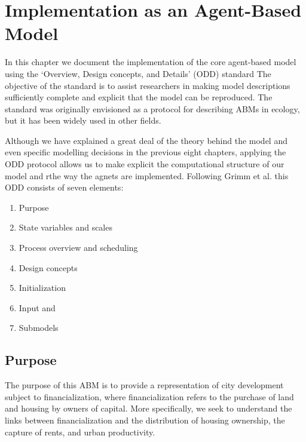 \chapter{Implementation as an Agent-Based Model} \label{chapter-agent-implementation}

In this chapter we document the implementation of the core agent-based model using the `Overview, Design concepts, and Details' (ODD) standard \cite{grimmODDProtocolReview2010a} The objective of the standard is to assist researchers in making model descriptions sufficiently complete and explicit that the model can be reproduced. The standard was originally envisioned as a protocol for describing ABMs in ecology, but it has been widely used in other fields.

Although we have explained a great deal of the theory behind the model and even specific modelling decisions in the previous eight chapters, applying the ODD protocol allows us to make explicit the computational structure of our model and rthe way the agnets are implemented. Following Grimm et al. \cite{grimmODDProtocolDescribing2020} this ODD consists of seven elements: %

\begin{enumerate}
    \item Purpose
    \item State variables and scales
    \item Process overview and scheduling 
    \item Design concepts
    \item Initialization
    \item Input and 
    \item Submodels 
\end{enumerate}




\section{Purpose}
The purpose of this ABM is to provide a representation of city development subject to financialization, where financialization refers to the purchase of land and housing by owners of capital. More specifically, we seek to understand the links between financialization and the distribution of housing ownership, the capture of rents, and urban productivity. 


